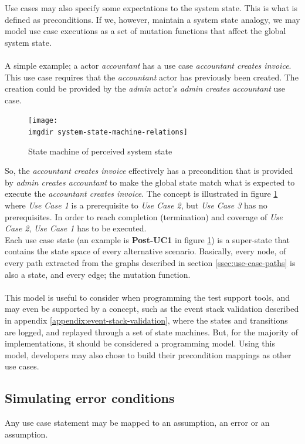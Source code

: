 Use cases may also specify some expectations to the system state. This is what is defined as preconditions. If we, however, maintain a system state analogy, we may model use case executions as a set of mutation functions that affect the global system state.\\\\
A simple example; a actor \emph{accountant} has a use case \emph{accountant creates invoice}. This use case requires that the \emph{accountant} actor has previously been created. The creation could be provided by the \emph{admin} actor's \emph{admin creates accountant} use case.
\begin{figure}[h]
\texttt{[image: \\imgdir system-state-machine-relations]}
\centering
\caption{State machine of perceived system state}
\label{fig:system-state-machine-relations}
\end{figure}
So, the \emph{accountant creates invoice} effectively has a precondition that is provided by \emph{admin creates accountant} to make the global state match what is expected to execute the \emph{accountant creates invoice}. The concept is illustrated in figure \ref{fig:system-state-machine-relations} where \emph{Use Case 1} is a prerequisite to \emph{Use Case 2}, but \emph{Use Case 3} has no prerequisites. In order to reach completion (termination) and coverage of \emph{Use Case 2}, \emph{Use Case 1} has to be executed.\\
Each use case state (an example is \textbf{Post-UC1} in figure \ref{fig:system-state-machine-relations}) is a super-state that contains the state space of every alternative scenario. Basically, every node, of every path extracted from the graphs described in section \ref{ssec:use-case-paths} is also a state, and every edge; the mutation function.\\\\
This model is useful to consider when programming the test support tools, and may even be supported by a concept, such as the event stack validation described in appendix \ref{appendix:event-stack-validation}, where the states and transitions are logged, and replayed through a set of state machines. But, for the majority of implementations, it should be considered a programming model. Using this model, developers may also chose to build their precondition mappings as other use cases.



\subsection{Simulating error conditions}
Any use case statement may be mapped to an assumption, an error or an assumption.

